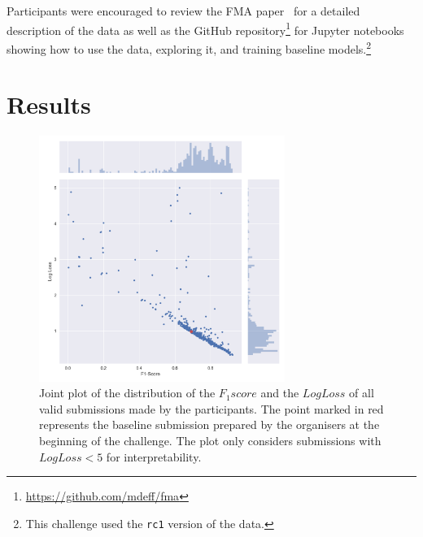 \documentclass[sigconf]{acmart}
\begin{document}
Participants were encouraged to review the FMA paper~\cite{fma_dataset} for a detailed description of the data as well as the GitHub repository\footnote{\url{https://github.com/mdeff/fma}} for Jupyter notebooks showing how to use the data, exploring it, and training baseline models.\footnote{This challenge used the \texttt{rc1} version of the data.}

\section{Results}


\begin{figure}[h]
\label{fig:jointplot}
\includegraphics[width=8cm]{images/plot-1}
\centering
\caption{Joint plot of the distribution of the $F_1 score$  and the $Log Loss$ of all valid submissions made by the participants. The point marked in red represents the baseline submission prepared by the organisers at the beginning of the challenge. The plot only considers submissions with $Log Loss < 5 $ for interpretability. }
\end{figure}
\end{document}
